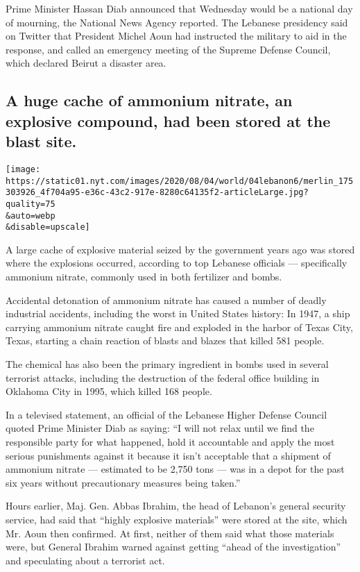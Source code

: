 Prime Minister Hassan Diab announced that Wednesday would be a national
day of mourning, the National News Agency reported. The Lebanese
presidency said on Twitter that President Michel Aoun had instructed the
military to aid in the response, and called an emergency meeting of the
Supreme Defense Council, which declared Beirut a disaster area.

\hypertarget{a-huge-cache-of-ammonium-nitrate-an-explosive-compound-had-been-stored-at-the-blast-site}{%
\subsection{A huge cache of ammonium nitrate, an explosive compound, had
been stored at the blast
site.}\label{a-huge-cache-of-ammonium-nitrate-an-explosive-compound-had-been-stored-at-the-blast-site}}

\texttt{[image: https://static01.nyt.com/images/2020/08/04/world/04lebanon6/merlin\_175303926\_4f704a95-e36c-43c2-917e-8280c64135f2-articleLarge.jpg?quality=75\\\&auto=webp\\\&disable=upscale]}

A large cache of explosive material seized by the government years ago
was stored where the explosions occurred, according to top Lebanese
officials --- specifically ammonium nitrate, commonly used in both
fertilizer and bombs.

Accidental detonation of ammonium nitrate has caused a number of deadly
industrial accidents, including the worst in United States history: In
1947, a ship carrying ammonium nitrate caught fire and exploded in the
harbor of Texas City, Texas, starting a chain reaction of blasts and
blazes that killed 581 people.

The chemical has also been the primary ingredient in bombs used in
several terrorist attacks, including the destruction of the federal
office building in Oklahoma City in 1995, which killed 168 people.

In a televised statement, an official of the Lebanese Higher Defense
Council quoted Prime Minister Diab as saying: ``I will not relax until
we find the responsible party for what happened, hold it accountable and
apply the most serious punishments against it because it isn't
acceptable that a shipment of ammonium nitrate --- estimated to be 2,750
tons --- was in a depot for the past six years without precautionary
measures being taken.''

Hours earlier, Maj. Gen. Abbas Ibrahim, the head of Lebanon's general
security service, had said that ``highly explosive materials'' were
stored at the site, which Mr. Aoun then confirmed. At first, neither of
them said what those materials were, but General Ibrahim warned against
getting ``ahead of the investigation'' and speculating about a terrorist
act.

